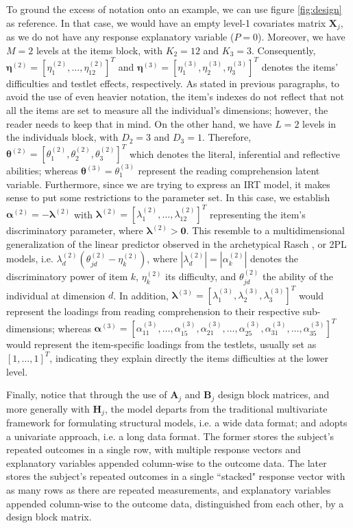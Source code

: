 To ground the excess of notation onto an example, we can use figure \ref{fig:design} as reference. In that case, we would have an empty level-1 covariates matrix $\mathbf{X}_{j}$, as we do not have any response explanatory variable ($P=0$). Moreover, we have $M=2$ levels at the items block, with $K_{2}=12$ and $K_{3}=3$. Consequently, $\pmb{\eta}^{(2)} = [ \eta_{1}^{(2)}, \dots, \eta_{12}^{(2)} ]^{T}$ and $\pmb{\eta}^{(3)} = [ \eta_{1}^{(3)}, \eta_{2}^{(3)}, \eta_{3}^{(3)} ]^{T}$ denotes the items' difficulties and testlet effects, respectively. As stated in previous paragraphs, to avoid the use of even heavier notation, the item's indexes do not reflect that not all the items are set to measure all the individual's dimensions; however, the reader needs to keep that in mind. On the other hand, we have $L=2$ levels in the individuals block, with $D_{2}=3$ and $D_{3}=1$. Therefore, $\pmb{\theta}^{(2)} = [ \theta_{1}^{(2)}, \theta_{2}^{(2)}, \theta_{3}^{(2)} ]^{T}$ which denotes the literal, inferential and reflective abilities; whereas $\pmb{\theta}^{(3)} = \theta_{1}^{(3)}$ represent the reading comprehension latent variable. Furthermore, since we are trying to express an IRT model, it makes sense to put some restrictions to the parameter set. In this case, we establish $\pmb{\alpha}^{(2)} = -\pmb{\lambda}^{(2)}$ with $ \pmb{\lambda}^{(2)} = [ \lambda_{1}^{(2)}, \dots, \lambda_{12}^{(2)} ]^{T}$ representing the item's discriminatory parameter, where $\pmb{\lambda}^{(2)} > \mathbf{0}$. This resemble to a multidimensional generalization of the linear predictor observed in the archetypical Rasch \cite{Rasch_1980}, or 2PL \cite{Lord_et_al_2008} models, i.e. $ \lambda^{(2)}_{d} (\theta^{(2)}_{jd} - \eta^{(2)}_{k} )$, where $| \lambda^{(2)}_{d} | = | \alpha^{(2)}_{k} |$ denotes the discriminatory power of item $k$, $\eta^{(2)}_{k}$ its difficulty, and $\theta^{(2)}_{jd}$ the ability of the individual at dimension $d$. In addition, $\pmb{\lambda}^{(3)} = [ \lambda_{1}^{(3)}, \lambda_{2}^{(3)}, \lambda_{3}^{(3)} ]^{T}$ would represent the loadings from reading comprehension to their respective sub-dimensions; whereas $\pmb{\alpha}^{(3)} = [ \alpha_{11}^{(3)}, \dots, \alpha_{15}^{(3)}, \alpha_{21}^{(3)}, \dots, \alpha_{25}^{(3)}, \alpha_{31}^{(3)}, \dots, \alpha_{35}^{(3)} ]^{T}$ would represent the item-specific loadings from the testlets, usually set as $[1,\dots,1]^{T}$, indicating they explain directly the items difficulties at the lower level.

Finally, notice that through the use of $\mathbf{A}_{j}$ and $\mathbf{B}_{j}$ design block matrices, and more generally with $\mathbf{H}_{j}$, the model departs from the traditional multivariate framework for formulating structural models, i.e. a wide data format; and adopts a univariate approach, i.e. a long data format. The former stores the subject’s repeated outcomes in a single row, with multiple response vectors and explanatory variables appended column-wise to the outcome data. The later stores the subject’s repeated outcomes in a single ``stacked" response vector with as many rows as there are repeated measurements, and explanatory variables appended column-wise to the outcome data, distinguished from each other, by a design block matrix. 

